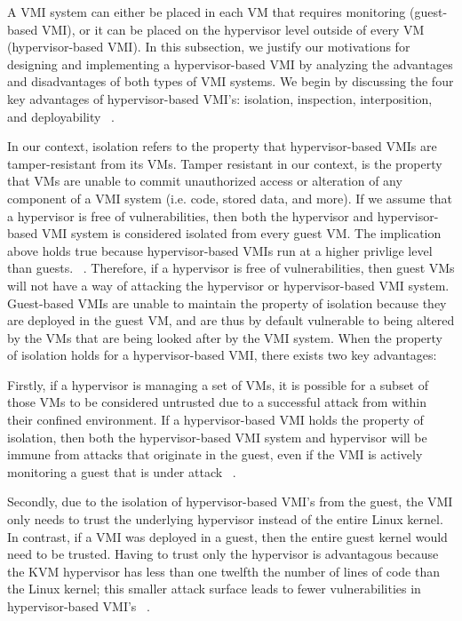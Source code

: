 \documentclass{report}
\begin{document}
\begin{spacing}{1.5}
{\large
A VMI system can either be placed in each VM that requires monitoring (guest-based VMI), or it can be placed on the hypervisor level outside of every VM (hypervisor-based VMI). In this subsection, we justify our motivations for designing and implementing a hypervisor-based VMI by analyzing the advantages and disadvantages of both types of VMI systems. We begin by discussing the four key advantages of hypervisor-based VMI's: isolation, inspection, interposition, and deployability ~\cite{pfoh2009formal}.
\newline
}


{\large
\noindent In our context, isolation refers to the property that hypervisor-based VMIs are tamper-resistant from its VMs. Tamper resistant in our context, is the property that VMs are unable to commit unauthorized access or alteration of any component of a VMI system (i.e. code, stored data, and more). If we assume that a hypervisor is free of vulnerabilities, then both the hypervisor and hypervisor-based VMI system is considered isolated from every guest VM. The implication above holds true because hypervisor-based VMIs run at a higher privlige level than guests. ~\cite{hebbal2015virtual}. Therefore, if a hypervisor is free of vulnerabilities, then guest VMs will not have a way of attacking the hypervisor or hypervisor-based VMI system. Guest-based VMIs are unable to maintain the property of isolation because they are deployed in the guest VM, and are thus by default vulnerable to being altered by the VMs that are being looked after by the VMI system. When the property of isolation holds for a hypervisor-based VMI, there exists two key advantages:
\newline
}

{\large
\noindent Firstly, if a hypervisor is managing a set of VMs, it is possible for a subset of those VMs to be considered untrusted due to a successful attack from within their confined environment. If a hypervisor-based VMI holds the property of isolation, then both the hypervisor-based VMI system and hypervisor will be immune from attacks that originate in the guest, even if the VMI is actively monitoring a guest that is under attack ~\cite{hebbal2015virtual}.
\newline
}

{\large
\noindent Secondly, due to the isolation of hypervisor-based VMI's from the guest, the VMI only needs to trust the underlying hypervisor instead of the entire Linux kernel. In contrast, if a VMI was deployed in a guest, then the entire guest kernel would need to be trusted. Having to trust only the hypervisor is advantagous because the KVM hypervisor has less than one twelfth the number of lines of code than the Linux kernel; this smaller attack surface leads to fewer vulnerabilities in hypervisor-based VMI's ~\cite{bauman2015survey}.
\newline
}




\end{spacing}
\end{document}

